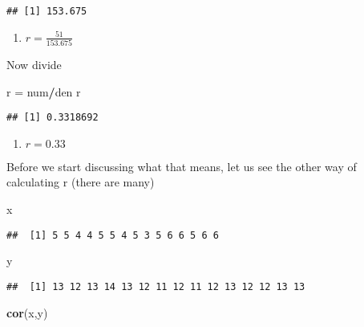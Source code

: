 \documentclass[]{article}
\newenvironment{Shaded}{\begin{snugshade}}{\end{snugshade}}
\newcommand{\KeywordTok}[1]{\textcolor[rgb]{0.13,0.29,0.53}{\textbf{#1}}}
\newcommand{\StringTok}[1]{\textcolor[rgb]{0.31,0.60,0.02}{#1}}
\newcommand{\OperatorTok}[1]{\textcolor[rgb]{0.81,0.36,0.00}{\textbf{#1}}}
\newcommand{\NormalTok}[1]{#1}
\providecommand{\tightlist}{%
  \setlength{\itemsep}{0pt}\setlength{\parskip}{0pt}}
\begin{document}
\begin{verbatim}
## [1] 153.675
\end{verbatim}

\begin{enumerate}
\def\labelenumi{\arabic{enumi}.}
\setcounter{enumi}{7}
\tightlist
\item
  \(r = \frac{51}{153.675}\)
\end{enumerate}

Now divide

\begin{Shaded}
\begin{Highlighting}[]
\NormalTok{r =}\StringTok{ }\NormalTok{num}\OperatorTok{/}\NormalTok{den}
\NormalTok{r}
\end{Highlighting}
\end{Shaded}

\begin{verbatim}
## [1] 0.3318692
\end{verbatim}

\begin{enumerate}
\def\labelenumi{\arabic{enumi}.}
\setcounter{enumi}{8}
\tightlist
\item
  \(r = 0.33\)
\end{enumerate}

Before we start discussing what that means, let us see the other way of
calculating r (there are many)

\begin{Shaded}
\begin{Highlighting}[]
\NormalTok{x}
\end{Highlighting}
\end{Shaded}

\begin{verbatim}
##  [1] 5 5 4 4 5 5 4 5 3 5 6 6 5 6 6
\end{verbatim}

\begin{Shaded}
\begin{Highlighting}[]
\NormalTok{y}
\end{Highlighting}
\end{Shaded}

\begin{verbatim}
##  [1] 13 12 13 14 13 12 11 12 11 12 13 12 12 13 13
\end{verbatim}

\begin{Shaded}
\begin{Highlighting}[]
\KeywordTok{cor}\NormalTok{(x,y)}
\end{Highlighting}
\end{Shaded}
\end{document}

